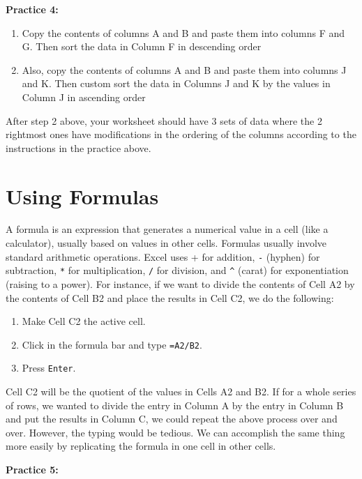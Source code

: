 \documentclass[
]{book}
\providecommand{\tightlist}{%
  \setlength{\itemsep}{0pt}\setlength{\parskip}{0pt}}
\begin{document}
\textbf{Practice 4:}

\begin{enumerate}
\def\labelenumi{\arabic{enumi}.}
\tightlist
\item
  Copy the contents of columns A and B and paste them into columns F and G. Then sort the data in Column F in descending order
\item
  Also, copy the contents of columns A and B and paste them into columns J and K. Then custom sort the data in Columns J and K by the values in Column J in ascending order
\end{enumerate}

After step 2 above, your worksheet should have 3 sets of data where the 2 rightmost ones have modifications in the ordering of the columns according to the instructions in the practice above.

\hypertarget{using-formulas}{%
\section{Using Formulas}\label{using-formulas}}

A formula is an expression that generates a numerical value in a cell (like a calculator), usually based on values in other cells.
Formulas usually involve standard arithmetic operations. Excel uses + for addition, \texttt{-} (hyphen) for subtraction, \texttt{*} for multiplication, \texttt{/} for division, and \texttt{\^{}} (carat) for exponentiation (raising to a power). For instance, if we want to divide the contents of Cell A2 by the contents of Cell B2 and place the results in Cell C2, we do the following:

\begin{enumerate}
\def\labelenumi{\arabic{enumi}.}
\tightlist
\item
  Make Cell C2 the active cell.
\item
  Click in the formula bar and type \texttt{=A2/B2}.
\item
  Press \texttt{Enter}.
\end{enumerate}

Cell C2 will be the quotient of the values in Cells A2 and B2.
If for a whole series of rows, we wanted to divide the entry in Column A by the entry in Column B and put the results in Column C, we could repeat the above process over and over. However, the typing would be tedious. We can accomplish the same thing more easily by replicating the formula in one cell in other cells.

\textbf{Practice 5:}
\end{document}
